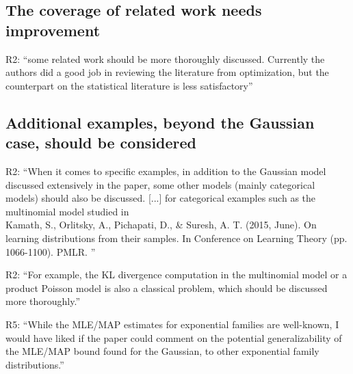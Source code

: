 

\subsection*{The coverage of related work needs improvement}

R2:
``some related work should be more thoroughly discussed. Currently the authors did a good job in reviewing the literature from optimization, but the counterpart on the statistical literature is less satisfactory''


\subsection*{Additional examples, beyond the Gaussian case, should be considered}

R2:
``When it comes to specific examples, in addition to the Gaussian model discussed extensively in the paper, some other models (mainly categorical models) should also be discussed.
[...] for categorical examples such as the multinomial model studied in
~\\
Kamath, S., Orlitsky, A., Pichapati, D., \& Suresh, A. T. (2015, June). On learning distributions from their samples. In Conference on Learning Theory (pp. 1066-1100). PMLR.
''

R2:
``For example, the KL divergence computation in the multinomial model or a product Poisson model is also a classical problem, which should be discussed more thoroughly.''

R5:
``While the MLE/MAP
estimates for exponential families are well-known, I would have liked if the
paper could comment on the potential generalizability of the MLE/MAP bound
found for the Gaussian, to other exponential family distributions.''

